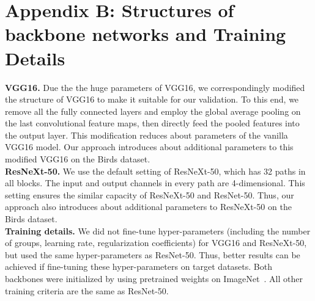 \documentclass[journal]{IEEEtran}
\begin{document}
\section*{Appendix B: Structures of backbone networks and Training Details}
\textbf{VGG16\cite{vggnet15zisserman}.} Due the the huge parameters of VGG16, we correspondingly modified the structure of VGG16 to make it suitable for our validation. To this end, we remove all the fully connected layers and employ the global average pooling on the last convolutional feature maps, then directly feed the pooled features into the output layer. This modification reduces about  parameters of the vanilla VGG16 model. Our approach introduces about  additional parameters to this modified VGG16 on the Birds dataset.
\\

\textbf{ResNeXt-50\cite{resnext17kaiming}.} We use the default setting of ResNeXt-50, which has 32 paths in all blocks. The input and output channels in every path are 4-dimensional. This setting ensures the similar capacity of ResNeXt-50 and ResNet-50. Thus, our approach also introduces about  additional parameters to ResNeXt-50 on the Birds dataset.
\\

\textbf{Training details.} We did not fine-tune hyper-parameters (including the number of groups, learning rate, regularization coefficients) for VGG16 and ResNeXt-50, but used the same hyper-parameters as ResNet-50. Thus, better results can be achieved if fine-tuning these hyper-parameters on target datasets. Both backbones were initialized by using pretrained weights on ImageNet~\cite{imagenet@feifei}. All other training criteria are the same as ResNet-50.
\end{document}
